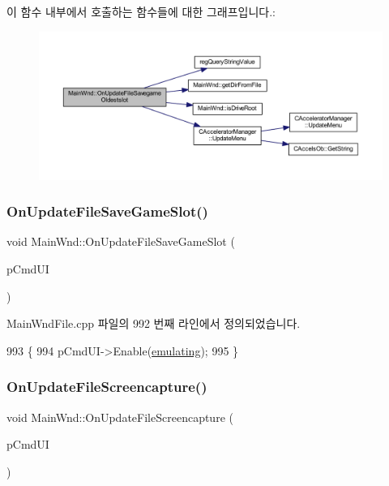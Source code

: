 이 함수 내부에서 호출하는 함수들에 대한 그래프입니다.\+:
\nopagebreak
\begin{figure}[H]
\begin{center}
\leavevmode
\includegraphics[width=350pt]{class_main_wnd_ac037eba8953facb1e191ad0b4bb6ff39_cgraph}
\end{center}
\end{figure}
\mbox{\label{class_main_wnd_a55a4bc3c3b2b956aa3a58af9a0656a79}} 
\subsubsection{\texorpdfstring{On\+Update\+File\+Save\+Game\+Slot()}{OnUpdateFileSaveGameSlot()}}
{\footnotesize\ttfamily void Main\+Wnd\+::\+On\+Update\+File\+Save\+Game\+Slot (\begin{DoxyParamCaption}\item[{C\+Cmd\+UI $\ast$}]{p\+Cmd\+UI }\end{DoxyParamCaption})}



Main\+Wnd\+File.\+cpp 파일의 992 번째 라인에서 정의되었습니다.


\begin{DoxyCode}
993 \{
994   pCmdUI->Enable(\mbox{\hyperlink{_main_wnd_file_8cpp_af9cc36078b1b311753963297ae7f2a74}{emulating}});
995 \}
\end{DoxyCode}
\mbox{\label{class_main_wnd_a5b9a0551c29d223054e314f8018e0ab9}} 
\subsubsection{\texorpdfstring{On\+Update\+File\+Screencapture()}{OnUpdateFileScreencapture()}}
{\footnotesize\ttfamily void Main\+Wnd\+::\+On\+Update\+File\+Screencapture (\begin{DoxyParamCaption}\item[{C\+Cmd\+UI $\ast$}]{p\+Cmd\+UI }\end{DoxyParamCaption})\hspace{0.3cm}{\ttfamily [protected]}}



